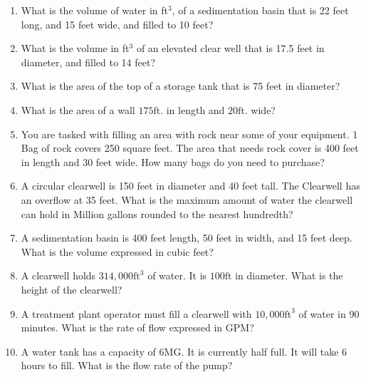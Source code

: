 \documentclass{article}
\begin{document}
\begin{enumerate}

\item What is the volume of water in ft$^3$, of a sedimentation basin that is 22 feet long, and 15 feet wide, and filled to 10 feet?

\item What is the volume in ft$^3$ of an elevated clear well that is 17.5 feet in diameter, and filled to 14 feet?

\item What is the area of the top of a storage tank that is 75 feet in diameter?\\

\item  What is the area of a wall $175 \mathrm{ft}$. in length and $20 \mathrm{ft}$. wide?\\

\item  You are tasked with filling an area with rock near some of your equipment. 1 Bag of rock covers 250 square feet. The area that needs rock cover is 400 feet in length and 30 feet wide. How many bags do you need to purchase?\\

\item A circular clearwell is 150 feet in diameter and 40 feet tall. The Clearwell has an overflow at 35 feet. What is the maximum amount of water the clearwell can hold in Million gallons rounded to the nearest hundredth?\\


\item  A sedimentation basin is 400 feet length, 50 feet in width, and 15 feet deep. What is the volume expressed in cubic feet?\\


\item  A clearwell holds $314,000 \mathrm{ft}^{3}$ of water. It is $100 \mathrm{ft}$ in diameter. What is the height of the clearwell?\\

\item  A treatment plant operator must fill a clearwell with $10,000 \mathrm{ft}^{3}$ of water in 90 minutes. What is the rate of flow expressed in GPM?\\


\item  A water tank has a capacity of 6MG. It is currently half full. It will take 6 hours to fill. What is the flow rate of the pump?\\



\end{enumerate}
\end{document}
